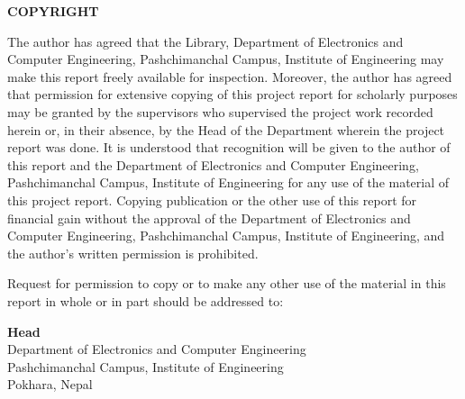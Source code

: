 \begin{center}
    \Large \textbf{COPYRIGHT}
\end{center}
    

\noindent
The author has agreed that the Library, Department of Electronics and Computer Engineering, 
Pashchimanchal Campus, Institute of Engineering may make this report freely available for 
inspection. Moreover, the author has agreed that permission for extensive copying of this project 
report for scholarly purposes may be granted by the supervisors who supervised the project work 
recorded herein or, in their absence, by the Head of the Department wherein the project report 
was done. It is understood that recognition will be given to the author of this report and the 
Department of Electronics and Computer Engineering, Pashchimanchal Campus, Institute of 
Engineering for any use of the material of this project report. Copying publication or the other 
use of this report for financial gain without the approval of the Department of Electronics and 
Computer Engineering, Pashchimanchal Campus, Institute of Engineering, and the author's 
written permission is prohibited.

\vspace{0.8cm}

\noindent
Request for permission to copy or to make any other use of the material in this report in whole or 
in part should be addressed to:

\vspace{0.8cm}

\noindent
\textbf{Head} \\
Department of Electronics and Computer Engineering \\
Pashchimanchal Campus, Institute of Engineering \\
Pokhara, Nepal
\newpage